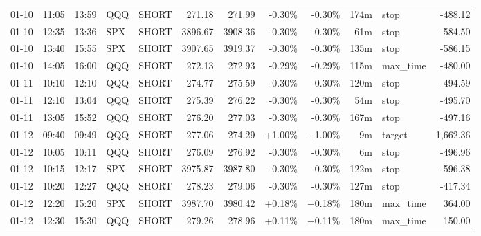 \documentclass[11pt,a4paper,twoside]{article}
\begin{document}
\begin{center}
\begin{longtable}{>{\color{txtmain}}l l l l l r r r r r >{\color{txtmain}}l r}
01-10 & 11:05 & 13:59 & QQQ & SHORT & 271.18 & 271.99 & \textcolor{lossred}{-0.30\%} & \textcolor{lossred}{-0.30\%} & 174m & stop & \textcolor{lossred}{-488.12} \\
01-10 & 12:35 & 13:36 & SPX & SHORT & 3896.67 & 3908.36 & \textcolor{lossred}{-0.30\%} & \textcolor{lossred}{-0.30\%} & 61m & stop & \textcolor{lossred}{-584.50} \\
01-10 & 13:40 & 15:55 & SPX & SHORT & 3907.65 & 3919.37 & \textcolor{lossred}{-0.30\%} & \textcolor{lossred}{-0.30\%} & 135m & stop & \textcolor{lossred}{-586.15} \\
01-10 & 14:05 & 16:00 & QQQ & SHORT & 272.13 & 272.93 & \textcolor{lossred}{-0.29\%} & \textcolor{lossred}{-0.29\%} & 115m & max\_time & \textcolor{lossred}{-480.00} \\
01-11 & 10:10 & 12:10 & QQQ & SHORT & 274.77 & 275.59 & \textcolor{lossred}{-0.30\%} & \textcolor{lossred}{-0.30\%} & 120m & stop & \textcolor{lossred}{-494.59} \\
01-11 & 12:10 & 13:04 & QQQ & SHORT & 275.39 & 276.22 & \textcolor{lossred}{-0.30\%} & \textcolor{lossred}{-0.30\%} & 54m & stop & \textcolor{lossred}{-495.70} \\
01-11 & 13:05 & 15:52 & QQQ & SHORT & 276.20 & 277.03 & \textcolor{lossred}{-0.30\%} & \textcolor{lossred}{-0.30\%} & 167m & stop & \textcolor{lossred}{-497.16} \\
01-12 & 09:40 & 09:49 & QQQ & SHORT & 277.06 & 274.29 & \textcolor{wingreen}{+1.00\%} & \textcolor{wingreen}{+1.00\%} & 9m & target & \textcolor{wingreen}{1,662.36} \\
01-12 & 10:05 & 10:11 & QQQ & SHORT & 276.09 & 276.92 & \textcolor{lossred}{-0.30\%} & \textcolor{lossred}{-0.30\%} & 6m & stop & \textcolor{lossred}{-496.96} \\
01-12 & 10:15 & 12:17 & SPX & SHORT & 3975.87 & 3987.80 & \textcolor{lossred}{-0.30\%} & \textcolor{lossred}{-0.30\%} & 122m & stop & \textcolor{lossred}{-596.38} \\
01-12 & 10:20 & 12:27 & QQQ & SHORT & 278.23 & 279.06 & \textcolor{lossred}{-0.30\%} & \textcolor{lossred}{-0.30\%} & 127m & stop & \textcolor{lossred}{-417.34} \\
01-12 & 12:20 & 15:20 & SPX & SHORT & 3987.70 & 3980.42 & \textcolor{wingreen}{+0.18\%} & \textcolor{wingreen}{+0.18\%} & 180m & max\_time & \textcolor{wingreen}{364.00} \\
01-12 & 12:30 & 15:30 & QQQ & SHORT & 279.26 & 278.96 & \textcolor{wingreen}{+0.11\%} & \textcolor{wingreen}{+0.11\%} & 180m & max\_time & \textcolor{wingreen}{150.00} \\

\end{longtable}
\end{center}
\end{document}

